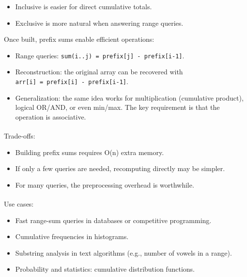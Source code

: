 \documentclass[
  letterpaper,
  DIV=11,
  numbers=noendperiod]{scrreprt}
\makeatletter
\let\oldparagraph\paragraph
\renewcommand{\paragraph}{
    \@ifstar
      \xxxParagraphStar
      \xxxParagraphNoStar
  }
\newcommand{\xxxParagraphStar}[1]{\oldparagraph*{#1}\mbox{}}
\newcommand{\xxxParagraphNoStar}[1]{\oldparagraph{#1}\mbox{}}
\providecommand{\tightlist}{%
  \setlength{\itemsep}{0pt}\setlength{\parskip}{0pt}}
\makeatother
\begin{document}
\begin{itemize}
\tightlist
\item
  Inclusive is easier for direct cumulative totals.
\item
  Exclusive is more natural when answering range queries.
\end{itemize}

Once built, prefix sums enable efficient operations:

\begin{itemize}
\tightlist
\item
  Range queries:
  \texttt{sum(i..j)\ =\ prefix{[}j{]}\ -\ prefix{[}i-1{]}}.
\item
  Reconstruction: the original array can be recovered with
  \texttt{arr{[}i{]}\ =\ prefix{[}i{]}\ -\ prefix{[}i-1{]}}.
\item
  Generalization: the same idea works for multiplication (cumulative
  product), logical OR/AND, or even min/max. The key requirement is that
  the operation is associative.
\end{itemize}

\paragraph{Trade-offs:}\label{trade-offs-1}

\begin{itemize}
\tightlist
\item
  Building prefix sums requires O(n) extra memory.
\item
  If only a few queries are needed, recomputing directly may be simpler.
\item
  For many queries, the preprocessing overhead is worthwhile.
\end{itemize}

\paragraph{Use cases:}\label{use-cases-1}

\begin{itemize}
\tightlist
\item
  Fast range-sum queries in databases or competitive programming.
\item
  Cumulative frequencies in histograms.
\item
  Substring analysis in text algorithms (e.g., number of vowels in a
  range).
\item
  Probability and statistics: cumulative distribution functions.
\end{itemize}
\end{document}
